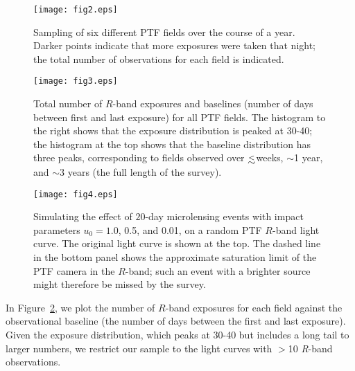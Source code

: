 \documentclass{emulateapj}
\newcommand{\lapprox }{{\lower0.8ex\hbox{$\buildrel <\over\sim$}}}
\begin{document}
\begin{figure}[h]
\begin{center}
\texttt{[image: fig2.eps]}
\caption{Sampling of six different PTF fields over the course of a year. Darker points indicate that more exposures were taken that night; the total number of observations for each field is indicated.}\label{fig:sampling}
\end{center}
\end{figure}

\begin{figure}[t]
\centering\texttt{[image: fig3.eps]}
\caption{Total number of $R$-band exposures and baselines (number of days between first and last exposure) for all PTF fields. The histogram to the right shows that the exposure distribution is peaked at 30-40; the histogram at the top shows that the baseline distribution has three peaks, corresponding to fields observed over $\lapprox$weeks, $\sim$1 year, and $\sim$3 years (the full length of the survey).}
\label{fig:num_obs}
\end{figure}

\begin{figure}[!h]
\centering\texttt{[image: fig4.eps]}
\caption{Simulating the effect of $20$-day microlensing events with impact parameters $u_0 = 1.0$, 0.5, and 0.01, on a random PTF $R$-band light curve. The original light curve is shown at the top. The dashed line in the bottom panel shows the approximate saturation limit of the PTF camera in the $R$-band; such an event with a brighter source might therefore be missed by the survey.}\label{fig:microlensing_sim}
\end{figure}

In Figure~\ref{fig:num_obs}, we plot the number of $R$-band exposures for each field against the observational baseline (the number of days between the first and last exposure). Given the exposure distribution, which peaks at 30-40 but includes a long tail to larger numbers, we restrict our sample to the light curves with $>$10 \textit{R}-band observations.  
\end{document}
